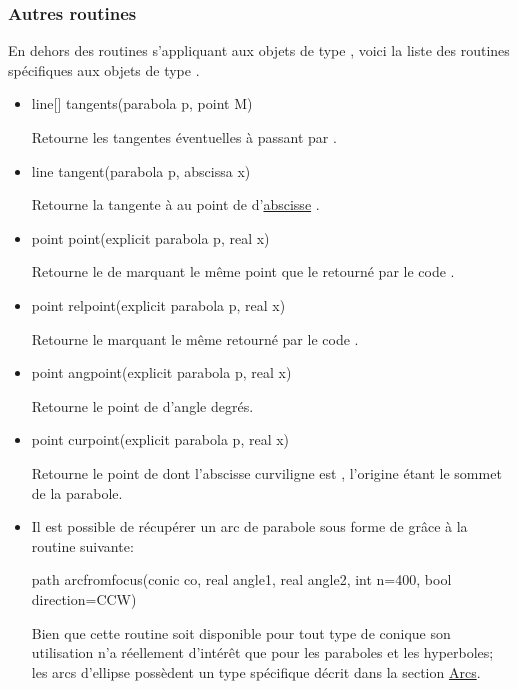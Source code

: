\documentclass[pdftex]{article}
\begin{document}
\subsubsection{Autres routines}
En dehors des routines s'appliquant aux objets de type ,
voici la liste des routines spécifiques aux objets de type
.
\begin{itemize}
\item {}
  \begin{Vcolor}
    line[] tangents(parabola p, point M)
  \end{Vcolor}
  Retourne les tangentes éventuelles à  passant
  par .
\item {}
  \begin{Vcolor}
    line tangent(parabola p, abscissa x)
  \end{Vcolor}
  Retourne la tangente à  au point de 
  d'\href{#section.abscissa}{abscisse} .
\item {}
  \begin{Vcolor}
    point point(explicit parabola p, real x)
  \end{Vcolor}
  Retourne le  de  marquant le même
  point que le  retourné par le code
  .
\item {}
  \begin{Vcolor}
    point relpoint(explicit parabola p, real x)
  \end{Vcolor}
  Retourne le  marquant le même  retourné par
  le code .
\item {}
  \begin{Vcolor}
    point angpoint(explicit parabola p, real x)
  \end{Vcolor}
  Retourne le point de  d'angle  degrés.
\item {}
  \begin{Vcolor}
    point curpoint(explicit parabola p, real x)
  \end{Vcolor}
  Retourne le point de  dont l'abscisse curviligne
  est , l'origine étant le sommet de la parabole.
\item Il est possible de récupérer un arc de parabole sous forme de
   grâce à la routine
  suivante:
  \begin{Vcolor}
    path arcfromfocus(conic co, real angle1, real angle2, int n=400, bool direction=CCW)
  \end{Vcolor}
  Bien que cette routine soit disponible pour tout type de conique son
  utilisation n'a réellement d'intérêt que pour les paraboles et les
  hyperboles; les arcs d'ellipse possèdent un type spécifique décrit dans
  la section \href{#section.arc}{Arcs}.


\end{itemize}
\end{document}

